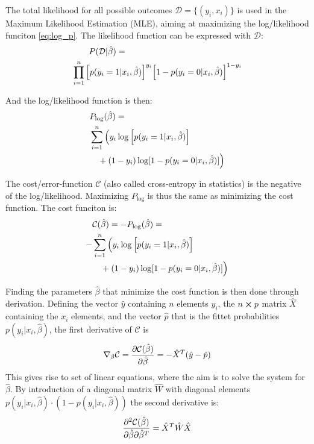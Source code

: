 The total likelihood for all possible outcomes $\mathcal{D}=\{(y_i,x_i)\}$ is used in the Maximum Likelihood Estimation (MLE), aiming at maximizing the log/likelihood funciton \eqref{eq:log_p}. The likelihood function can be expressed with $\mathcal{D}$:
\begin{equation*}
\begin{split}
    &\qquad P(\mathcal{D}|\hat{\beta}) = \\
    &\prod_{i=1}^n \qty[p(y_i = 1|x_i,\hat{\beta}) ]^{y_i}  \qty[1 - p(y_i = 0|x_i,\hat{\beta})]^{1-y_i}
\end{split}
\end{equation*}

And the log/likelihood function is then:
\begin{equation}
\begin{split}
    &P_{\log}(\hat{\beta}) = \\
    &\sum_{i=1}^n \Big(y_i \log \qty[p(y_i = 1|x_i,\hat{\beta})] \\
    &\quad+ (1-y_i) \log [1 - p(y_i = 0|x_i,\hat{\beta})]\Big)
\end{split}
\label{eq:log_p}
\end{equation}

The cost/error-function $\mathcal{C}$ (also called cross-entropy in statistics) is the negative of the log/likelihood. Maximizing $P_{\log}$ is thus the same as minimizing the cost function. The cost funciton is:
\begin{equation}
  \begin{split}
    &\mathcal{C}(\hat{\beta}) = - P_{\log}(\hat{\beta}) =  \\
    -&\sum_{i=1}^n \Big(y_i \log \qty[p(y_i = 1|x_i,\hat{\beta})] \\
    &\quad+ (1-y_i) \log [1 - p(y_i = 0|x_i,\hat{\beta})]\Big)
  \end{split}
  \label{eq:cost_function}
\end{equation}

Finding the parameters $\hat{\beta}$ that minimize the cost function is then done through derivation.
Defining the vector $\hat{y}$ containing $n$ elements $y_i$, the $n \cross p$ matrix $\hat{X}$ containing the $x_i$ elements, and the vector $\hat{p}$ that is the fittet probabilities $p(y_i|x_i,\hat{\beta})$, the first derivative of $\mathcal{C}$ is
\begin{equation}
  \nabla_\beta \mathcal{C} = \pdv{\mathcal{C}(\hat{\beta})}{\hat{\beta}} = - \hat{X}^T (\hat{y}-\hat{p})
  \label{eq:cost_d}
\end{equation}
This gives rise to set of linear equations, where the aim is to solve the system for $\hat{\beta}$.
By introduction of a diagonal matrix $\hat{W}$ with diagonal elements $p(y_i|x_i,\hat{\beta})\cdot(1-p(y_i|x_i,\hat{\beta}))$ the second derivative is:
\begin{equation}
 \pdv[2]{\mathcal{C}(\hat{\beta})}{\hat{\beta}}{\hat{\beta}^T} = \hat{X}^T\hat{W}\hat{X}
 \label{eq:cost_dd}
\end{equation}

